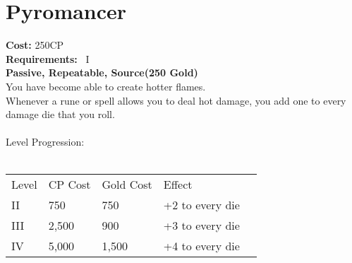 \section{Pyromancer}\label{perk:pyromancer}
\textbf{Cost:} 250CP\\
\textbf{Requirements:}~ I\\
\textbf{Passive, Repeatable, Source(250 Gold)}\\
You have become able to create hotter flames.\\
Whenever a rune or spell allows you to deal hot damage, you add one to every damage die that you roll.\\
\\
Level Progression:\\
\\
\begin{tabular}{l | l | l | l | l}
    Level & CP Cost & Gold Cost &  Effect\\
    II & 750 & 750 & +2 to every die\\
    III & 2,500 & 900 & +3 to every die\\
    IV & 5,000 & 1,500 & +4 to every die\\
\end{tabular}